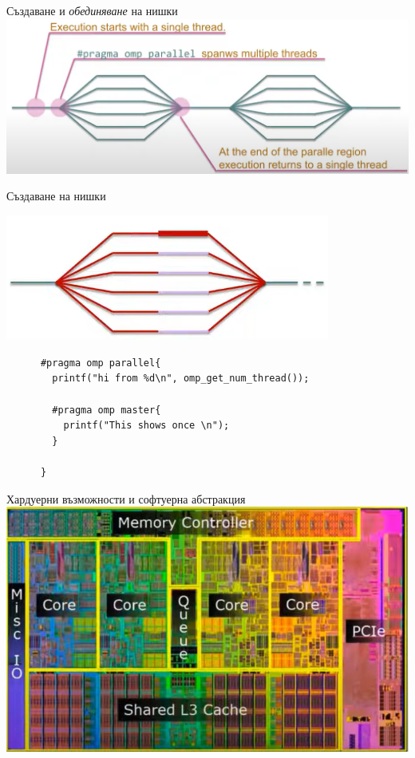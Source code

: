 \documentclass{beamer}
\begin{document}
\begin{frame}{Създаване и \textit{обединяване} на нишки}
  \includegraphics[width=\textwidth]{fork-join.png}
\end{frame}

\begin{frame}[fragile]{Създаване на нишки}
  
    \includegraphics[width=0.8\textwidth]{master-thread}
    \begin{lstlisting}
      #pragma omp parallel{
        printf("hi from %d\n", omp_get_num_thread());

        #pragma omp master{
          printf("This shows once \n");
        }

      }
    \end{lstlisting}
\end{frame}

\begin{frame}{Хардуерни възможности и софтуерна абстракция}
  \includegraphics[width=\textwidth]{soft-hard}
\end{frame}
\end{document}
